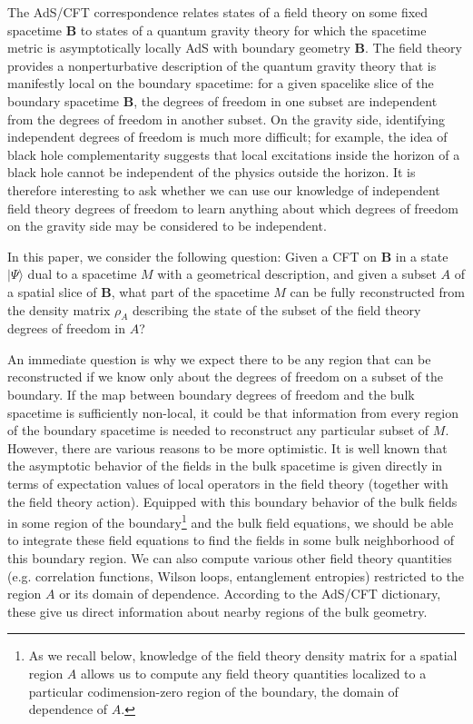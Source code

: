\documentclass[12pt]{article}
\renewcommand{\(}{\left(}
\renewcommand{\)}{\right)}
\begin{document}
The AdS/CFT correspondence \cite{malda, agmoo} relates states of a field theory on some fixed spacetime {\bf B} to states of a quantum gravity theory for which the spacetime metric is asymptotically locally AdS with boundary geometry {\bf B}. The field theory provides a nonperturbative description of the quantum gravity theory that is manifestly local on the boundary spacetime: for a given spacelike slice of the boundary spacetime {\bf B}, the degrees of freedom in one subset are independent from the degrees of freedom in another subset. On the gravity side, identifying independent degrees of freedom is much more difficult; for example, the idea of black hole complementarity \cite{stu} suggests that local excitations inside the horizon of a black hole cannot be independent of the physics outside the horizon. It is therefore interesting to ask whether we can use our knowledge of independent field theory degrees of freedom to learn anything about which degrees of freedom on the gravity side may be considered to be independent.

In this paper, we consider the following question: Given a CFT on {\bf B} in a state $|\Psi \rangle$ dual to a spacetime $M$ with a geometrical description, and given a subset $A$ of a spatial slice of {\bf B}, what part of the spacetime $M$ can be fully reconstructed from the density matrix $\rho_A$ describing the state of the subset of the field theory degrees of freedom in $A$?

An immediate question is why we expect there to be any region that can be reconstructed if we know only about the degrees of freedom on a subset of the boundary. If the map between boundary degrees of freedom and the bulk spacetime is sufficiently non-local, it could be that information from every region of the boundary spacetime is needed to reconstruct any particular subset of $M$. However, there are various reasons to be more optimistic. It is well known that the asymptotic behavior of the fields in the bulk spacetime is given directly in terms of expectation values of local operators in the field theory (together with the field theory action). Equipped with this boundary behavior of the bulk fields in some region of the boundary\footnote{As we recall below, knowledge of the field theory density matrix for a spatial region $A$ allows us to compute any field theory quantities localized to a particular codimension-zero region of the boundary, the domain of dependence of $A$.} and the bulk field equations, we should be able to integrate these field equations to find the fields in some bulk neighborhood of this boundary region. We can also compute various other field theory quantities (e.g. correlation functions, Wilson loops, entanglement entropies) restricted to the region $A$ or its domain of dependence. According to the AdS/CFT dictionary, these give us direct information about nearby regions of the bulk geometry.
\end{document}
